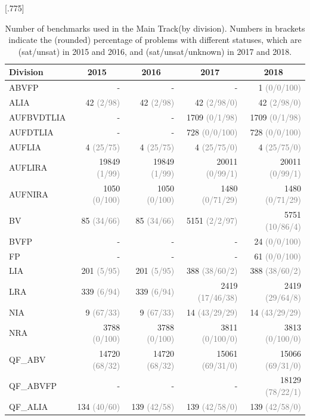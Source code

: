 \documentclass[dvipsnames,table,twoside,11pt]{article}
\newcommand{\maintrack}{Main Track\xspace}
\newcommand{\gray}[1]{\textcolor{gray}{#1}}
\begin{document}
\begin{table}
  \caption{Number of benchmarks used in the \maintrack (by division). Numbers in brackets indicate the (rounded) percentage of problems with different statuses, which are (sat/unsat) in 2015 and 2016, and (sat/unsat/unknown) in 2017 and 2018.}
  \label{table:benchmarks-main-track}
  \centering
  \scalebox{.9}[.775]{\begin{tabular}{lrrrr}
    \toprule
    Division & \multicolumn{1}{c}{2015} & \multicolumn{1}{c}{2016} & \multicolumn{1}{c}{2017} & \multicolumn{1}{c}{2018} \\
    \midrule
    ABVFP & - & - & - & 1 \gray{(0/0/100)}\\
    ALIA & 42 \gray{(2/98)} & 42 \gray{(2/98)} & 42 \gray{(2/98/0)} & 42 \gray{(2/98/0)}\\
    AUFBVDTLIA & - & - & 1709 \gray{(0/1/98)} & 1709 \gray{(0/1/98)}\\
    AUFDTLIA & - & - & 728 \gray{(0/0/100)} & 728 \gray{(0/0/100)}\\
    AUFLIA & 4 \gray{(25/75)} & 4 \gray{(25/75)} & 4 \gray{(25/75/0)} & 4 \gray{(25/75/0)}\\
    AUFLIRA & 19849 \gray{(1/99)} & 19849 \gray{(1/99)} & 20011 \gray{(0/99/1)} & 20011 \gray{(0/99/1)}\\
    AUFNIRA & 1050 \gray{(0/100)} & 1050 \gray{(0/100)} & 1480 \gray{(0/71/29)} & 1480 \gray{(0/71/29)}\\
    BV & 85 \gray{(34/66)} & 85 \gray{(34/66)} & 5151 \gray{(2/2/97)} & 5751 \gray{(10/86/4)}\\
    BVFP & - & - & - & 24 \gray{(0/0/100)}\\
    FP & - & - & - & 61 \gray{(0/0/100)}\\
    LIA & 201 \gray{(5/95)} & 201 \gray{(5/95)} & 388 \gray{(38/60/2)} & 388 \gray{(38/60/2)}\\
    LRA & 339 \gray{(6/94)} & 339 \gray{(6/94)} & 2419 \gray{(17/46/38)} & 2419 \gray{(29/64/8)}\\
    NIA & 9 \gray{(67/33)} & 9 \gray{(67/33)} & 14 \gray{(43/29/29)} & 14 \gray{(43/29/29)}\\
    NRA & 3788 \gray{(0/100)} & 3788 \gray{(0/100)} & 3811 \gray{(0/100/0)} & 3813 \gray{(0/100/0)}\\
    QF\_ABV & 14720 \gray{(68/32)} & 14720 \gray{(68/32)} & 15061 \gray{(69/31/0)} & 15066 \gray{(69/31/0)}\\
    QF\_ABVFP & - & - & - & 18129 \gray{(78/22/1)}\\
    QF\_ALIA & 134 \gray{(40/60)} & 139 \gray{(42/58)} & 139 \gray{(42/58/0)} & 139 \gray{(42/58/0)}\\

\end{tabular}}
\end{table}
\end{document}
